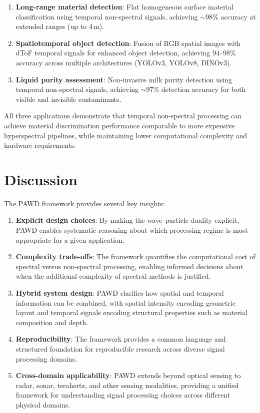 \documentclass[11pt]{article}
\begin{document}
\begin{enumerate}
    \item \textbf{Long-range material detection}: Flat homogeneous surface material classification using temporal non-spectral signals, achieving $\sim$98\% accuracy at extended ranges (up to 4\,m).
    
    \item \textbf{Spatiotemporal object detection}: Fusion of RGB spatial images with dToF temporal signals for enhanced object detection, achieving 94--98\% accuracy across multiple architectures (YOLOv3, YOLOv8, DINOv3).
    
    \item \textbf{Liquid purity assessment}: Non-invasive milk purity detection using temporal non-spectral signals, achieving $\sim$97\% detection accuracy for both visible and invisible contaminants.
\end{enumerate}

All three applications demonstrate that temporal non-spectral processing can achieve material discrimination performance comparable to more expensive hyperspectral pipelines, while maintaining lower computational complexity and hardware requirements.

\section{Discussion}

The PAWD framework provides several key insights:

\begin{enumerate}
    \item \textbf{Explicit design choices}: By making the wave--particle duality explicit, PAWD enables systematic reasoning about which processing regime is most appropriate for a given application.
    
    \item \textbf{Complexity trade-offs}: The framework quantifies the computational cost of spectral versus non-spectral processing, enabling informed decisions about when the additional complexity of spectral methods is justified.
    
    \item \textbf{Hybrid system design}: PAWD clarifies how spatial and temporal information can be combined, with spatial intensity encoding geometric layout and temporal signals encoding structural properties such as material composition and depth.
    
    \item \textbf{Reproducibility}: The framework provides a common language and structured foundation for reproducible research across diverse signal processing domains.
    
    \item \textbf{Cross-domain applicability}: PAWD extends beyond optical sensing to radar, sonar, terahertz, and other sensing modalities, providing a unified framework for understanding signal processing choices across different physical domains.
\end{enumerate}
\end{document}

